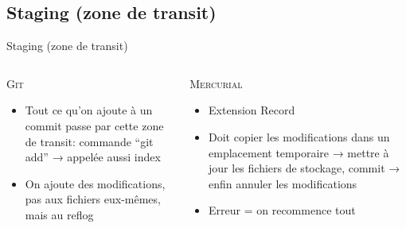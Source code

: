\subsection{Staging (zone de transit)}
\begin{frame}{Staging (zone de transit)}
  \begin{columns}[T]

    \begin{column}{.5\textwidth}
      \textsc{Git}
      \begin{itemize}
        \item{Tout ce qu’on ajoute à un commit passe par cette zone de transit:
              commande “git add” → appelée aussi index}
        \item{On ajoute des modifications, pas aux fichiers eux-mêmes,
              mais au reflog}
      \end{itemize}
    \end{column}

    \begin{column}{.5\textwidth}
      \textsc{Mercurial}
      \begin{itemize}
        \item{Extension Record}
        \item{Doit copier les modifications dans un emplacement temporaire →
              mettre à jour les fichiers de stockage, commit → enfin annuler
              les modifications}
        \item{Erreur = on recommence tout}
      \end{itemize}
    \end{column}

  \end{columns}
\end{frame}
